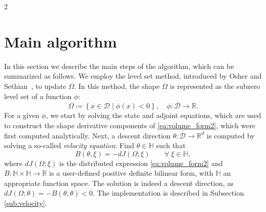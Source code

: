 \documentclass[a4paper, oneside]{article}
\newcommand{\Om}{\Omega}
\newcommand{\VV}{\theta}
\newcommand{\R}{\mathds{R}}
\begin{document}
\begin{multicols}{2}
\section{Main algorithm}
\label{sec:algo}

In this section we describe the main steps of the algorithm, which can be summarized as follows. 
We employ the level set method, introduced by Osher and Sethian~\cite{MR965860}, to update $\Om$. 
In this method, the shape $\Om$ is represented as the subzero level set of a function $\phi$:
\begin{equation} \label{eq:subdomain}
	\Omega \coloneqq \left\{x\in\mathcal{D}\mid \phi(x)<0\right\},
	\quad
	\phi:\overline{\mathcal{D}} \rightarrow \mathds{R}.
\end{equation}
For a given $\phi$, we start by solving the state and adjoint equations, which are used  to construct the shape derivative components of  \eqref{ea:volume_form2}, which were first computed analytically.
Next, a descent direction $\VV: \overline{\mathcal{D}}\to\R^d$ is computed by solving a so-called {\it velocity equation}:
Find $\theta\in\mathbb{H}$ such that
\begin{equation}\label{eq:velocity_eq0} 
	B(\theta, \xi) = - dJ(\Omega ;\xi)\qquad \forall \; \xi \in \mathbb{H},
\end{equation}	
where $dJ(\Omega ;\xi)$ is the distributed expression \eqref{ea:volume_form2} and $B:\mathbb{H}\times \mathbb{H} \rightarrow \mathds{R}$ is a user-defined positive definite bilinear form, with $\mathbb{H}$ an appropriate function space.
The solution is indeed a descent direction, as  $dJ(\Omega ;\VV) = - B(\VV,\VV)<0
$.
The implementation is described in Subsection \ref{sub:velocity}.




\end{multicols}
\end{document}
